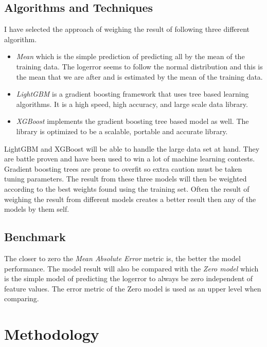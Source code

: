 \documentclass[a4paper]{article}
\begin{document}
\subsection{Algorithms and Techniques}
I have selected the approach of weighing the result of following three different algorithm.
\begin{itemize}
    \item
        \textit{Mean} which is the simple prediction of predicting all by the mean of the training data. The logerror seems to follow the normal distribution and this is the mean that we are after and is estimated by the mean of the training data.
    \item
        \textit{LightGBM} is a gradient boosting framework that uses tree based learning algorithms. It is a high speed, high accuracy, and large scale data library.
    \item
        \textit{XGBoost} implements the gradient boosting tree based model as well. The library is optimized to be a scalable, portable and accurate library.
\end{itemize}
LightGBM and XGBoost will be able to handle the large data set at hand. They are battle proven and have been used to win a lot of machine learning contests. Gradient boosting trees are prone to overfit so extra caution must be taken tuning parameters. The result from these three models will then be weighted according to the best weights found using the training set. Often the result of weighing the result from different models creates a better result then any of the models by them self.

\subsection{Benchmark}
The closer to zero the \textit{Mean Absolute Error} metric is, the better the model performance. The model result will also be compared with the \textit{Zero model} which is the simple model of predicting the logerror to always be zero independent of feature values. The error metric of the Zero model is used as an upper level when comparing.


\section{Methodology}
\end{document}
